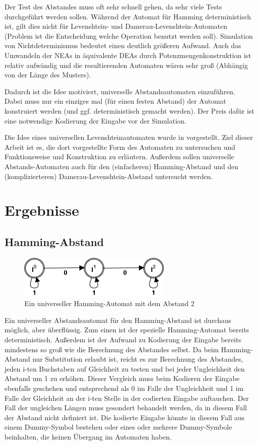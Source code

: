 Der Test des Abstandes muss oft sehr schnell gehen, da sehr viele Tests durchgeführt werden sollen. Während der Automat für Hamming deterministisch ist, gilt dies nicht für Levenshtein- und Damerau-Levenshtein-Automaten (Problem ist die Entscheidung welche Operation benutzt werden soll). Simulation von Nichtdeterminismus bedeutet einen deutlich größeren Aufwand. Auch das Umwandeln der NEAs in äquivalente DEAs durch Potenzmengenkonstruktion ist relativ aufwändig und die resultierenden Automaten wären sehr groß (Abhängig von der Länge des Musters).

Dadurch ist die Idee motiviert, universelle Abstandsautomaten einzuführen. Dabei muss nur ein einziges mal (für einen festen Abstand) der Automat konstruiert werden (und ggf. deterministisch gemacht werden). Der Preis dafür ist eine notwendige Kodierung der Eingabe vor der Simulation.

Die Idee eines universellen Levenshteinautomaten wurde in \cite{lit01} vorgestellt. Ziel dieser Arbeit ist es, die dort vorgestellte Form des Automaten zu untersuchen und Funktionsweise und Konstruktion zu erläutern. Außerdem sollen universelle Abstands-Automaten auch für den (einfacheren) Hamming-Abstand und den (komplizierteren) Damerau-Levenshtein-Abstand untersucht werden.
\section{Ergebnisse}
\subsection{Hamming-Abstand}
\begin{figure}[!htb]
\centering
\includegraphics[scale=0.7]{pic/automata/unihamming}%
\caption{Ein universeller Hamming-Automat mit dem Abstand 2}%
\end{figure}
Ein universeller Abstandsautomat für den Hamming-Abstand ist durchaus möglich, aber überflüssig. Zum einen ist der spezielle Hamming-Automat bereits deterministisch. Außerdem ist der Aufwand zu Kodierung der Eingabe bereits mindestens so groß wie die Berechnung des Abstandes selbst. Da beim Hamming-Abstand nur Substitution erlaubt ist, reicht es zur Berechnung des Abstandes, jeden i-ten Buchstaben auf Gleichheit zu testen und bei jeder Ungleichheit den Abstand um 1 zu erhöhen. Dieser Vergleich muss beim Kodieren der Eingabe ebenfalls geschehen und entsprechend als 0 im Falle der Ungleichheit und 1 im Falle der Gleichheit an der i-ten Stelle in der codierten Eingabe auftauchen. Der Fall der ungleichen Längen muss gesondert behandelt werden, da in diesem Fall der Abstand nicht definiert ist. Die kodierte Eingabe könnte in diesem Fall aus einem Dummy-Symbol bestehen oder eines oder mehrere Dummy-Symbole beinhalten, die keinen Übergang im Automaten haben.
